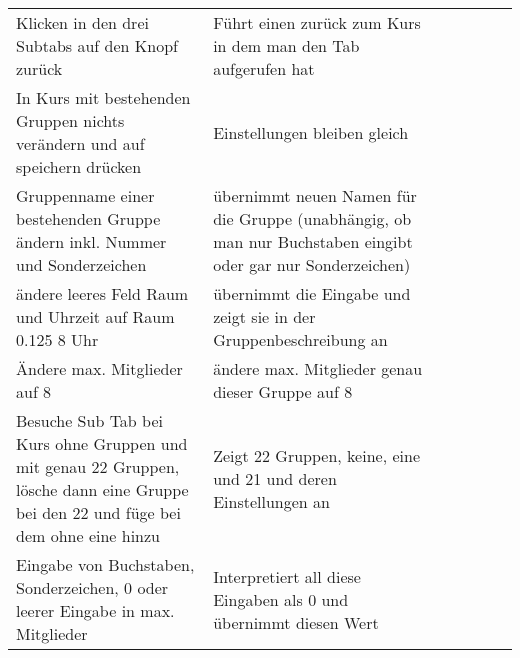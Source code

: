\begin{table}[]
\begin{tabular}{p{6cm}p{7cm}p{3cm}llll}
		Klicken in den drei Subtabs auf den Knopf zurück                                                                                     & Führt einen zurück zum Kurs in dem man den Tab aufgerufen hat                                                                                                    & \checkmark           &  &  &  \\
		In Kurs mit bestehenden Gruppen nichts verändern und auf speichern drücken                                                            & Einstellungen bleiben gleich                                                                                                                                     & \checkmark           &  &  &  \\
		Gruppenname einer bestehenden Gruppe ändern inkl. Nummer und Sonderzeichen                                                      & übernimmt neuen Namen für die Gruppe (unabhängig, ob man nur Buchstaben eingibt oder gar nur Sonderzeichen)                                                            & \checkmark           &  &  &  \\
		ändere leeres Feld Raum und Uhrzeit auf Raum 0.125 8 Uhr                                                                           & übernimmt die Eingabe und zeigt sie in der Gruppenbeschreibung an                                                                                                & \checkmark           &  &  &  \\
		Ändere max. Mitglieder auf 8                                                                                                          & ändere max. Mitglieder genau dieser Gruppe auf 8                                                                                                                 & \checkmark           &  &  &  \\
		Besuche Sub Tab bei Kurs ohne Gruppen und mit genau 22 Gruppen, lösche dann eine Gruppe bei den 22 und füge bei dem ohne eine hinzu & Zeigt 22 Gruppen, keine, eine und 21 und deren Einstellungen an                                                                                                  & \checkmark           &  &  &  \\
		Eingabe von Buchstaben, Sonderzeichen, 0 oder leerer Eingabe  in max. Mitglieder                                                      & Interpretiert all diese Eingaben als 0 und übernimmt diesen Wert                                                                                                 & \checkmark           &  &  &  \\

\end{tabular}
\end{table}

